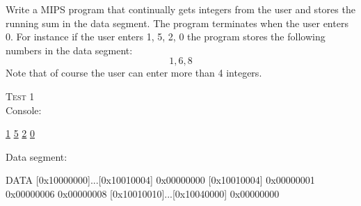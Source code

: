

\renewcommand\AUTHOR{aoro1@cougars.ccis.edu} %


\topmattertwo

\nextq
Write a MIPS program that continually gets integers from the user and stores 
the running sum in the data segment. 
The program terminates when the user enters 0. 
For instance if the user enters 1, 5, 2, 0 the program stores 
the following numbers in the data segment:
\[
	1, 6, 8
\]
Note that of course the user can enter more than 4 integers.


\textsc{Test 1} \\
Console:
\begin{console}[fontsize=\footnotesize,commandchars=\\\{\}]
\underline{1}
\underline{5}
\underline{2}
\underline{0}
\end{console}
Data segment:
\begin{console}[fontsize=\footnotesize,commandchars=\\\{\}]
	DATA
[0x10000000]...[0x10010004]  0x00000000
[0x10010004]                 0x00000001  0x00000006  0x00000008
[0x10010010]...[0x10040000]  0x00000000
\end{console}
\ANSWER
{}
\newpage

